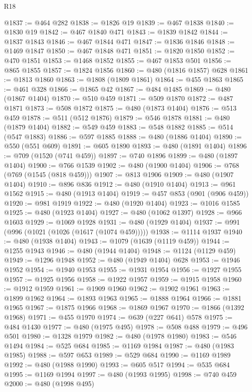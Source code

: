 \begin{lexlean}{R18}
\begin{coremodule}
@1837 := @464 @282
@1838 := @1826 @19
@1839 := @467 @1838
@1840 := @1830 @19
@1842 := @467 @1840 @471
@1843 := @1839 @1842
@1844 := @1837 @1843
@1846 := @467 @1844 @471
@1847 := @1836 @1846
@1848 := @1469 @1847
@1850 := @467 @1848 @471
@1851 := @1820 @1850
@1852 := @470 @1851
@1853 := @1468 @1852
@1855 := @467 @1853 @501
@1856 := @865 @1855
@1857 := @1824 @1856
@1860 := @480 (@1816 @1857) @628
@1861 := @1813 @1860
@1863 := @1808 (@1809 @1861)
@1864 := @455 @1863
@1865 := @461 @328
@1866 := @1865 @42
@1867 := @484 @1485
@1869 := @480 (@1867 @1404)
@1870 := @510 @459
@1871 := @509 @1870
@1872 := @487 @1871
@1873 := @508 @1872
@1875 := @480 (@1873 @1404)
@1876 := @513 @459
@1878 := @511 (@512 @1876)
@1879 := @546 @1878
@1881 := @480 (@1879 @1404)
@1882 := @549 @459
@1883 := @548 @1882
@1885 := @514 (@547 @1883)
@1886 := @597 @1885
@1888 := @480 (@1886 @1404)
@1890 := @550 (@551 @609)
@1891 := @605 @1890
@1893 := @480 (@1891 @1404)
@1896 := @709 (@1520 (@741 @459))
@1897 := @740 @1896
@1899 := @480 (@1897 @1404)
@1900 := @766 @1539
@1902 := @480 (@1900 @1404)
@1906 := @768 (@769 (@1545 (@818 @459)))
@1907 := @813 @1906
@1909 := @480 (@1907 @1404)
@1910 := @896 @836
@1912 := @480 (@1910 @1404)
@1913 := @961 @1562
@1915 := @480 (@1913 @1404)
@1919 := @457 @853 (@901 (@906 @459))
@1920 := @981 @1919
@1922 := @480 (@1920 @1404)
@1923 := @1016 @1585
@1925 := @480 (@1923 @1404)
@1927 := @480 (@1062 @1397)
@1928 := @966 @1603
@1929 := @1069 @1928
@1931 := @480 (@1929 @1404)
@1937 := @991 (@996 (@1021 (@1026 (@1617 (@1074 @459)))))
@1938 := @1114 @1937
@1940 := @480 (@1938 @1404)
@1943 := @1079 (@1639 (@1119 @459))
@1944 := @1255 @1943
@1946 := @480 (@1944 @1404)
@1948 := @1124 (@1129 @459)
@1949 := @1296 @1948
@1952 := @480 (@1949 @1404) @628
@1953 := @1946 @1952
@1954 := @1940 @1953
@1955 := @1931 @1954
@1956 := @1927 @1955
@1957 := @1925 @1956
@1958 := @1922 @1957
@1959 := @1915 @1958
@1960 := @1912 @1959
@1961 := @1909 @1960
@1962 := @1902 @1961
@1963 := @1899 @1962
@1964 := @1893 @1963
@1965 := @1888 @1964
@1966 := @1881 @1965
@1967 := @1875 @1966
@1968 := @1869 @1967
@1970 := @1866 (@1392 @1968)
@1971 := @455 @1970
@1974 := @639 (@227 @641) @578
@1975 := @484 @1430
@1977 := @480 (@1975 @495)
@1978 := @508 @488
@1979 := @496 @501
@1980 := @1328 @1979
@1982 := @480 (@1978 @1980)
@1983 := @546 @1494
@1984 := @525 @684
@1985 := @1169 @1984
@1987 := @480 (@1983 @1985)
@1988 := @597 @653
@1989 := @529 @684
@1990 := @1169 @1989
@1992 := @480 (@1988 @1990)
@1993 := @605 @517
@1994 := @535 @684
@1995 := @1169 @1994
@1997 := @480 (@1993 @1995)
@1998 := @740 @459
@2000 := @480 (@1998 @495)

\end{coremodule}
\end{lexlean}
